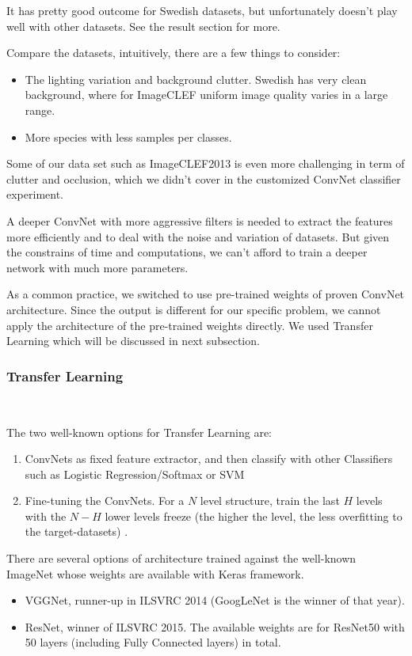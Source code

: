 \documentclass[journal, 10pt]{IEEEtran}
\begin{document}
  It has pretty good outcome for Swedish datasets, but unfortunately doesn't play well with other datasets. See the result section for more.

  Compare the datasets, intuitively, there are a few things to consider:
  \begin{itemize}
    \item The lighting variation and background clutter. Swedish has very clean background, where for ImageCLEF uniform image quality varies in a large range.
    \item More species with less samples per classes.
  \end{itemize}

  Some of our data set such as ImageCLEF2013 is even more challenging in term of clutter and occlusion, which we didn't cover in the customized ConvNet classifier experiment.

  A deeper ConvNet with more aggressive filters is needed to extract the features more efficiently and to deal with the noise and variation of datasets. But given the constrains of time and computations, we can't afford to train a deeper network with much more parameters.

  As a common practice, we switched to use pre-trained weights of proven ConvNet architecture. Since the output is different for our specific problem, we cannot apply the architecture of the pre-trained weights directly. We used Transfer Learning which will be discussed in next subsection.\par

  \subsubsection{Transfer Learning} \

  The two well-known options for Transfer Learning are:
  \begin{enumerate}
    \item ConvNets as fixed feature extractor, and then classify with other Classifiers such as Logistic Regression/Softmax or SVM
    \item Fine-tuning the ConvNets. For a $N$ level structure, train the last $H$ levels with the $N-H$ lower levels freeze (the higher the level, the less overfitting to the target-datasets) \cite{CS231N}.
  \end{enumerate}

  There are several options of architecture trained against the well-known ImageNet whose weights are available with Keras framework.
  \begin{itemize}
    \item VGGNet, runner-up in ILSVRC 2014 (GoogLeNet is the winner of that year).
    \item ResNet, winner of ILSVRC 2015. The available weights are for ResNet50 with 50 layers (including Fully Connected layers) in total.
  \end{itemize}
\end{document}
